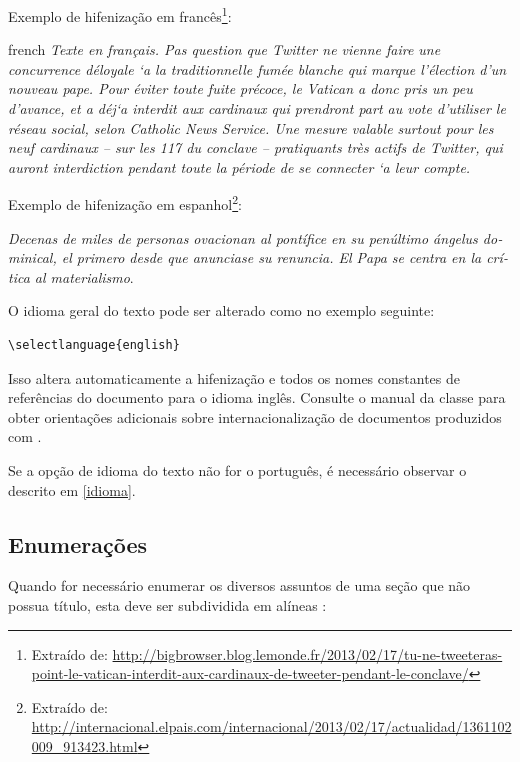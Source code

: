 Exemplo de hifenização em franc\^es\footnote{Extraído de:
	\url{http://bigbrowser.blog.lemonde.fr/2013/02/17/tu-ne-tweeteras-point-le-vatican-interdit-aux-cardinaux-de-tweeter-pendant-le-conclave/}}:

\begin{otherlanguage*}{french}
	\textit{Texte en français. Pas question que Twitter ne vienne faire une
		concurrence d\'eloyale `a la traditionnelle fum\'ee blanche qui marque l'\'election
		d'un nouveau pape. Pour \'eviter toute fuite pr\'ecoce, le Vatican a donc pris un
		peu d'avance, et a d\'ej`a interdit aux cardinaux qui prendront part au vote
		d'utiliser le r\'eseau social, selon Catholic News Service. Une mesure valable
		surtout pour les neuf cardinaux – sur les 117 du conclave – pratiquants très
		actifs de Twitter, qui auront interdiction pendant toute la p\'eriode de se
		connecter `a leur compte.}
\end{otherlanguage*}

Exemplo de hifenização em espanhol\footnote{Extraído de:
	\url{http://internacional.elpais.com/internacional/2013/02/17/actualidad/1361102009_913423.html}}:

\foreignlanguage{spanish}{\textit{Decenas de miles de personas ovacionan al pontífice en su
		penúltimo \'angelus dominical, el primero desde que anunciase su renuncia. El Papa se
		centra en la crítica al materialismo}}.

O idioma geral do texto pode ser alterado como no exemplo seguinte:

\begin{verbatim}
\selectlanguage{english}

\end{verbatim}

Isso altera automaticamente a hifenização e todos os nomes constantes de
refer\^encias do documento para o idioma ingl\^es. Consulte o manual da classe para obter orientações adicionais sobre internacionalização de documentos produzidos com \textsf{\abnTeX} \cite{abnetxclasse}.

Se a opção de idioma do texto não for o portugu\^es, \'e necess\'ario observar o descrito em \ref{idioma}.

\subsection{Enumerações}

Quando for necess\'ario enumerar
os diversos assuntos de uma seção que não possua título, esta deve ser
subdividida em alíneas \cite[4.2]{nbr6024}:

